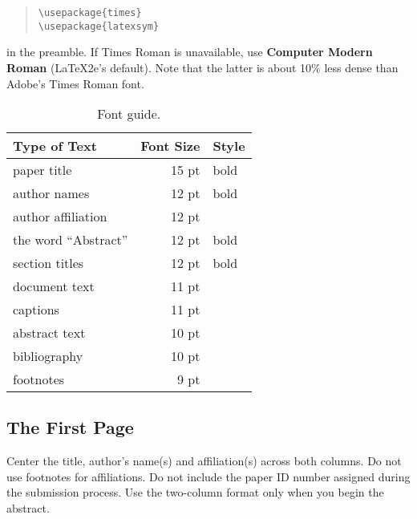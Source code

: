 \documentclass[11pt]{article}
\begin{document}
\begin{quote}
\begin{verbatim}
\usepackage{times}
\usepackage{latexsym}
\end{verbatim}
\end{quote}
in the preamble. If Times Roman is unavailable, use {\bf Computer
  Modern Roman} (\LaTeX2e{}'s default).  Note that the latter is about
  10\% less dense than Adobe's Times Roman font.


\begin{table}[h]
\begin{center}
\begin{tabular}{|l|rl|}
\hline \bf Type of Text & \bf Font Size & \bf Style \\ \hline
paper title & 15 pt & bold \\
author names & 12 pt & bold \\
author affiliation & 12 pt & \\
the word ``Abstract'' & 12 pt & bold \\
section titles & 12 pt & bold \\
document text & 11 pt  &\\
captions & 11 pt & \\
abstract text & 10 pt & \\
bibliography & 10 pt & \\
footnotes & 9 pt & \\
\hline
\end{tabular}
\end{center}
\caption{\label{font-table} Font guide. }
\end{table}

\subsection{The First Page}
\label{ssec:first}

Center the title, author's name(s) and affiliation(s) across both
columns. Do not use footnotes for affiliations. Do not include the
paper ID number assigned during the submission process. Use the
two-column format only when you begin the abstract.
\end{document}
